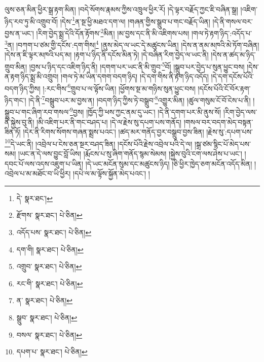 ལུས་ཅན་མིན་ཕྱིར་སྒྲ་རྟག་མིན། །བདེ་སོགས་རྣམས་ཀྱིས་འཁྲུལ་ཕྱིར་རོ། །དེ་ལྟར་བརྗོད་ཀྱང་ཇི་བཞིན་སྒྲ། །འཇིག་ཉིད་རབ་ཏུ་མི་འགྲུབ་བོ། །དེས་\footnote{དེ་  སྣར་ཐང་། }ན་སྔ་ཕྱི་མཐའ་དག་ལ། །གཞན་གྱིས་སྒྲུབ་པ་གང་བརྗོད་ཡིན། །དེ་ནི་གསལ་བར་བྱས་ན་ཡང་། །རིག་བྱེད་སྨྲ་དེའི་དོན་རྟོགས་\footnote{རྫོགས་  སྣར་ཐང་།  པེ་ཅིན། }མིན། །མ་བྱས་དང་ནི་མི་འཇིགས་པས། །གལ་ཏེ་རྟག་ཉིད་:འདོད་པ་\footnote{འདོད་པས་  སྣར་ཐང་།  པེ་ཅིན། }ན། །བཀག་པ་ཙམ་གྱི་དངོས་:དག་གིས།\footnote{དག་གི།  སྣར་ཐང་།  པེ་ཅིན། } །ནུས་མེད་ལ་ཡང་དེ་མཚུངས་ཡིན། །དེས་ན་ནམ་མཁའི་མེ་ཏོག་བཞིན། །དེས་ན་ཇི་ལྟར་མཁའི་པད་མ། །རྟག་པ་ཉིད་ནི་དངོས་མིན་ཏེ། །དེ་བཞིན་རིག་བྱེད་ལ་ཡང་ནི། །དེས་ན་ཚད་མ་ཉིད་གྲུབ་མིན། །བྱས་པ་ཉིད་དང་འཇིག་ཉིད་ནི། །དགག་པར་ཡང་ནི་མི་གྲུབ་\footnote{འགྲུབ་  སྣར་ཐང་།  པེ་ཅིན། }བོ། །སྒྲུབ་པར་བྱེད་པ་སུན་ཕྱུང་བས། །དེས་ན་རྟག་ཉིད་སྨྲ་མི་འགྲུབ། །གལ་ཏེ་མ་ཡིན་དགག་བདག་ཉིད། །དེ་དག་གིས་ནི་རྟག་ཉིད་འདོད། །དེ་དག་དངོས་པོའི་བདག་ཉིད་ཀྱིས། །:རང་གིས་\footnote{རང་གི་  སྣར་ཐང་།  པེ་ཅིན། }གྲུབ་པ་ལ་ལྟོས་ཡིན། །ཕྱོགས་སྔ་མ་གཉིས་སུན་ཕྱུང་བས། །དངོས་པོའི་ངོ་བོར་རྟག་ཉིད་གང་། །དེ་ནི་\footnote{ན་  སྣར་ཐང་།  པེ་ཅིན། }བསྒྲུབ་པར་མ་བྱས་ན། །བདག་ཉིད་ཀྱིས་ཏེ་བསྒྲུབ་\footnote{སྒྲུབ་  སྣར་ཐང་།  པེ་ཅིན། }འགྱུར་མིན། །ཚུལ་གསུམ་ངོ་བོ་ངེས་པ་ནི། །སྒྲུབ་པ་གང་ཞིག་རབ་གསལ་\footnote{བསལ་  སྣར་ཐང་།  པེ་ཅིན། }བྱས། །ཁྱོད་ཀྱི་ཕས་ཀྱང་ནམ་དུ་ཡང་། །དེ་ནི་དགག་པར་མི་ནུས་སོ། །རིག་བྱེད་ལས་ནི་སྐྱེས་བུ་ནི། །མི་འཇིག་པར་ནི་གང་བཤད་པ། །དེ་ལ་རྗེས་སུ་དཔག་པས་གནོད། །གསལ་བར་བདག་མེད་བསྟན་ཟིན་ཏོ། །དེར་ནི་རིགས་སོགས་གཞན་སྨྲས་པའང་། །ཚད་མར་གནོད་བྱར་བསྒྲུབ་བྱས་ཟིན། །རྗེས་སུ་:དཔག་པས་\footnote{དཔག་པ་  སྣར་ཐང་།  པེ་ཅིན། }དེ་ཡང་ནི། །འབྲེལ་པ་ངེས་ཅན་སྔར་བཤད་ཟིན། །དངོས་པོའི་རྗེས་འབྲེལ་པའི་དེ་ལ། །སྒྲ་ཙམ་སྙིང་པོ་མེད་པས་སམ། །ཡང་ན་དེ་ལས་བྱུང་བློ་ཡིས། །རྨོངས་པ་སུ་ཞིག་གནོད་སྙམ་སེམས། །སྐྱེས་བུའི་ངག་ལས་ཤེས་པ་ཡང་། །དབང་པོ་ལས་འདས་འཇུག་པ་ཡིན། །དེ་ཡང་མངོན་སུམ་དང་མཚུངས་ཉིད། །ཅི་ཕྱིར་ཁྱེད་ཅག་མངོན་འདོད་མིན། །འབྲེལ་པ་མ་མཐོང་བ་ཡི་ཕྱིར། །དཔེ་ལ་མ་ལྟོས་སྐྱོན་མེད་པའང་། །
